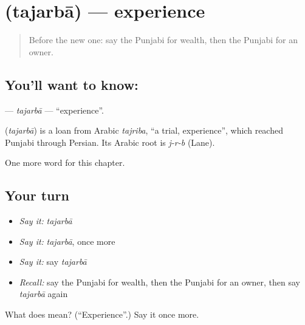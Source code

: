 \section[\texorpdfstring{\pa{ਤਜਰਬਾ} (tajarbā)}{ਤਜਰਬਾ (tajarbā)}]{ (tajarbā) — experience}

\label{lesson:PA-C111-tajarba}



\begin{quote}
Before the new one: say the Punjabi for wealth, then the Punjabi for an owner.
\end{quote}

\subsection*{You'll want to know: }
\textbf{} — \emph{tajarbā} — \textquotedblleft{}experience\textquotedblright{}.

\begin{cousinweb}
\textbf{} (\emph{tajarbā}) is a loan from Arabic \emph{tajriba}, \textquotedblleft{}a trial, experience\textquotedblright{}, which reached Punjabi through Persian. Its Arabic root is \emph{j-r-b} (Lane).
\end{cousinweb}

\begin{grammarlens}[title={What you've built}]
One more word for this chapter.
\end{grammarlens}

\subsection*{Your turn}
\begin{itemize}
\raggedright
  \item \emph{Say it:} \emph{tajarbā}
  \item \emph{Say it:} \emph{tajarbā}, once more
  \item \emph{Say it:} say \emph{tajarbā}
  \item \emph{Recall:} say the Punjabi for wealth, then the Punjabi for an owner, then say \emph{tajarbā} again
\end{itemize}

\begin{tcolorbox}[breakable,colback=teal!4,colframe=teal!35!black,title={Before you move on}]
What does  mean? (\textquotedblleft{}Experience\textquotedblright{}.) Say it once more.
\end{tcolorbox}
